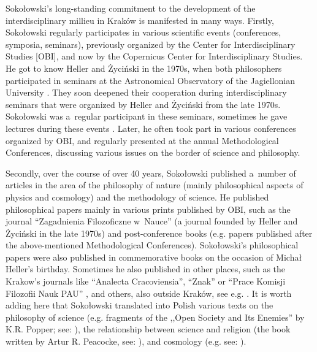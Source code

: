 \documentclass[%
  manuscript=article,
  year=2024,
  volume=77,
  doi=00000.000,
]{zfn}
\begin{document}
Sokołowski's long-standing commitment to the development of the interdisciplinary millieu in Kraków is manifested in many ways. Firstly, Sokołowski regularly participates in various scientific events (conferences, symposia, seminars), previously organized by the Center for Interdisciplinary Studies [OBI], and now by the Copernicus Center for Interdisciplinary Studies. He got to know Heller and Życiński in the 1970s, when both philosophers participated in seminars at the Astronomical Observatory of the Jagiellonian University 
\parencite[][]{}. %
 They soon deepened their cooperation during interdisciplinary seminars that were organized by Heller and Życiński from the late 1970s. Sokołowski was a~regular participant in these seminars, sometimes he gave lectures during these events 
\parencite[][]{Liana1999Z}. %
 Later, he often took part in various conferences organized by OBI, and regularly presented at the annual Methodological Conferences, discussing various issues on the border of science and philosophy.



Secondly, over the course of over 40 years, Sokołowski published a~number of articles in the area of the philosophy of nature (mainly philosophical aspects of physics and cosmology) and the methodology of science. He published philosophical papers mainly in various prints published by OBI, such as the journal ``Zagadnienia Filozoficzne w~Nauce'' (a journal founded by Heller and Życiński in the late 1970s) and post-conference books (e.g. papers published after the above-mentioned Methodological Conferences). Sokołowski's philosophical papers were also published in commemorative books on the occasion of Michał Heller's birthday. Sometimes he also published in other places, such as the Krakow's journals like ``Analecta Cracoviensia'', ``Znak'' or ``Prace Komisji Filozofii Nauk PAU'' 
\parencite[e.g.,][]{}, %
 and others, also outside Kraków, see e.g. 
\parencites[][]{}[][]{}[][]{}. %
 It is worth adding here that Sokołowski translated into Polish various texts on the philosophy of science (e.g. fragments of the ,,Open Society and Its Enemies'' by K.R. Popper; see: 
\parencite[][]{Popper1987Hegel}%
), the relationship between science and religion (the book written by Artur R. Peacocke, see: 
\parencite[][]{Peacocke1991Teologia}%
), and cosmology (e.g. see: 
\parencite[][]{Davies1996Zasada}%
).
\end{document}
